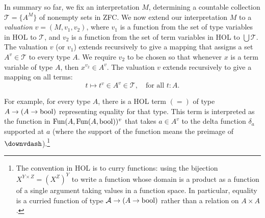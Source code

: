 \documentclass[brochure,english,12pt]{bourbaki}
\theoremstyle{plain}
\def\A{{\mathcal A}}
\def\T{{\mathcal T}}
\begin{document}
In summary so far,
we fix an interpretation $M$, determining a countable collection $\T =\{A^M\}$ of nonempty sets in 
ZFC.  
We now extend our interpretation $M$ to a {\it valuation} $v=(M,v_1,v_2)$, where $v_1$ is a function
from the set of type variables in HOL to $\T$, and $v_2$ is a function from the set of term
variables in HOL to $\bigcup\T$.
The valuation $v$ (or $v_1$) extends recursively to give a mapping that assigns
a set $A^{v}\in \T$ to every type $A$.  We require $v_2$ to be chosen so that whenever $x$ is a term variable of type $A$,
then $x^{v_2} \in A^v$.  The valuation $v$ extends recursively to give a mapping on all terms:
\[
t\mapsto t^v \in A^v \in \T, \quad \text{for all } t:A.
\]

For example,
for every type $A$,
there is a HOL term $(=)$ of type $A\to (A\to {\operatorname{bool}})$ representing equality for that type. 
This term is interpreted
as the function in ${\operatorname{Fun}}(A,{\operatorname{Fun}}(A,{\operatorname{bool}}))^{v}$ that
takes $a\in A^{v}$ to the delta function $\delta_a$ supported at $a$
(where the support of the function means 
the preimage of $\downvdash$).\footnote{The convention in HOL is to curry functions: using the bijection
$X^{Y \times Z} = (X^Z)^Y$ to write a function whose domain is a product as a function
of a single argument taking values in a function space. In particular, 
equality is a curried function of type $\A\to (A \to\bool)$
rather than a relation on $A\times A$.}


\end{document}
